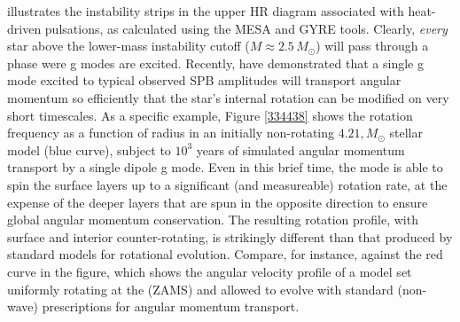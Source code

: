  illustrates the instability strips in the upper HR diagram associated with heat-driven pulsations, as calculated using the MESA and GYRE tools. Clearly, \emph{every} star above the lower-mass instability cutoff ($M \approx 2.5\,M_{\odot}$) will pass through a phase were g modes are excited. Recently, \citet{Townsend:2017} have demonstrated that a single g mode excited to typical observed SPB amplitudes will transport angular momentum so efficiently that the star's internal rotation can be modified on very short timescales. As a specific example, Figure \ref{334438} shows the rotation frequency as a function of radius in an initially non-rotating $4.21,M_{\odot}$ stellar model (blue curve), subject to $10^3$ years of simulated angular momentum transport by a single dipole g mode. Even in this brief time, the mode is able to spin the surface layers up to a significant (and measureable) rotation rate, at the expense of the deeper layers that are spun in the opposite direction to ensure global angular momentum conservation. The resulting rotation profile, with surface and interior counter-rotating, is strikingly different than that produced by standard models for rotational evolution. Compare, for instance, against the red curve in the figure, which shows the angular velocity profile of a model set uniformly rotating at the (ZAMS) and allowed to evolve with standard (non-wave) prescriptions for angular momentum transport.


